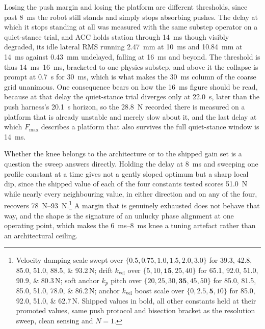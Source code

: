 \documentclass[a4paper,fleqn]{cas-dc}
\begin{document}
Losing the push margin and losing the platform are different thresholds, since
past \SI{8}{ms} the robot still stands and simply stops absorbing pushes. The
delay at which it stops standing at all was measured with the same substep
operator on a quiet-stance trial, and ACC holds station through \SI{14}{ms}
though visibly degraded, its idle lateral RMS running \SI{2.47}{mm} at
\SI{10}{ms} and \SI{10.84}{mm} at \SI{14}{ms} against \SI{0.43}{mm} undelayed,
falling at \SI{16}{ms} and beyond. The threshold is thus \SIrange{14}{16}{ms},
bracketed to one physics substep, and above it the collapse is prompt at
\SI{0.7}{s} for \SI{30}{ms}, which is what makes the \SI{30}{ms} column of the
coarse grid unanimous. One consequence bears on how the \SI{16}{ms} figure should
be read, because at that delay the quiet-stance trial diverges only at
\SI{22.0}{s}, later than the push harness's \SI{20.1}{s} horizon, so the
\SI{28.8}{N} recorded there is measured on a platform that is already unstable
and merely slow about it, and the last delay at which $F_{\max}$ describes a
platform that also survives the full quiet-stance window is \SI{14}{ms}.

Whether the knee belongs to the architecture or to the shipped gain set is a
question the sweep answers directly. Holding the delay at \SI{8}{ms} and sweeping
one profile constant at a time gives not a gently sloped optimum but a sharp
local dip, since the shipped value of each of the four constants tested scores
\SI{51.0}{N} while nearly every neighbouring value, in either direction and on
any of the four, recovers \SIrange{78}{93}{N}.\footnote{Velocity damping scale
swept over $\{0.5, 0.75, 1.0, \mathbf{1.5}, 2.0, 3.0\}$ for
\numlist{39.3;42.8;85.0;51.0;88.5;93.2}\,N; drift $k_{\text{vel}}$ over
$\{5,10,\mathbf{15},25,40\}$ for \numlist{65.1;92.0;51.0;90.9;80.3}\,N; soft
anchor $k_p$ pitch over $\{20,25,30,\mathbf{35},45,50\}$ for
\numlist{85.0;81.5;85.0;51.0;78.0;86.2}\,N; anchor $k_{\text{vel}}$ boost scale
over $\{0,2.5,\mathbf{5},10\}$ for \numlist{85.0;92.0;51.0;62.7}\,N. Shipped
values in bold, all other constants held at their promoted values, same push
protocol and bisection bracket as the resolution sweep, clean sensing and
$N{=}1$.} A margin that is genuinely exhausted does not behave that way, and the
shape is the signature of an unlucky phase alignment at one operating point,
which makes the \SIrange{6}{8}{ms} knee a tuning artefact rather than an
architectural ceiling.
\end{document}
